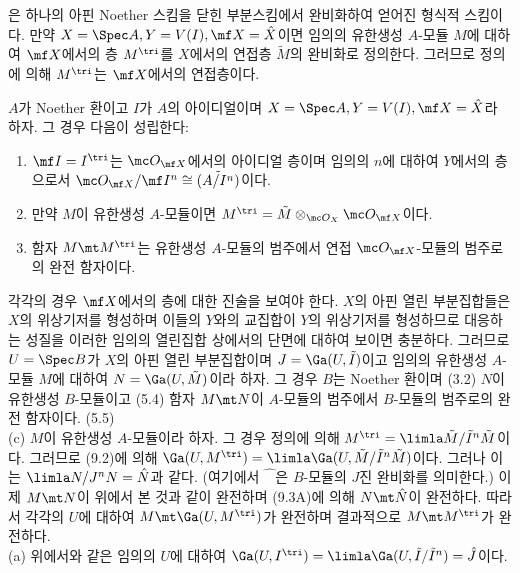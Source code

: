	
	\begin{definition}
	은
	하나의 아핀 Noether 스킴을 닫힌 부분스킴에서 완비화하여 얻어진 형식적 스킴이다.
	만약 $X=\Spec A,Y=V(I),\mf X=\hat X$이면 임의의 유한생성 $A$-모듈 $M$에 대하여 $\mf X$에서의 층 $M^\tri$를
	$X$에서의 연접층 $\tilde M$의 완비화로 정의한다. 그러므로 정의에 의해 $M^\tri$는 $\mf X$에서의 연접층이다.
	\end{definition}
	
	
	\begin{proposition}
	$A$가 Noether 환이고 $I$가 $A$의 아이디얼이며 $X=\Spec A,Y=V(I),\mf X=\hat X$라 하자. 그 경우 다음이 성립한다:
	\begin{enumerate}[label=(\alph*)]
	\item $\mf I=I^\tri$는 $\mc O_{\mf X}$에서의 아이디얼 층이며
	임의의 $n$에 대하여 $Y$에서의 층으로서 $\mc O_{\mf X}/\mf I^n\cong\tilde{(A/I^n)}$이다.
	\item 만약 $M$이 유한생성 $A$-모듈이면 $M^\tri=\tilde M\otimes_{\mc O_X}\mc O_{\mf X}$이다.
	\item 함자 $M\mt M^\tri$는 유한생성 $A$-모듈의 범주에서 연접 $\mc O_{\mf X}$-모듈의 범주로의 완전 함자이다.\\
	\end{enumerate}
	\pf 각각의 경우 $\mf X$에서의 층에 대한 진술을 보여야 한다.
	$X$의 아핀 열린 부분집합들은 $X$의 위상기저를 형성하며 이들의 $Y$와의 교집합이 $Y$의 위상기저를 형성하므로
	대응하는 성질을 이러한 임의의 열린집합 상에서의 단면에 대하여 보이면 충분하다.
	그러므로 $U=\Spec B$가 $X$의 아핀 열린 부분집합이며 $J=\Ga(U,\tilde I)$이고
	임의의 유한생성 $A$-모듈 $M$에 대하여 $N=\Ga(U,\tilde M)$이라 하자.
	그 경우 $B$는 Noether 환이며 (3.2) $N$이 유한생성 $B$-모듈이고 (5.4)
	함자 $M\mt N$이 $A$-모듈의 범주에서 $B$-모듈의 범주로의 완전 함자이다. (5.5)\\
	(c) $M$이 유한생성 $A$-모듈이라 하자. 그 경우 정의에 의해 $M^\tri=\limla\tilde M/\tilde I^n\tilde M$이다.
	그러므로 (9.2)에 의해 $\Ga(U,M^\tri)=\limla\Ga(U,\tilde M/\tilde I^n\tilde M)$이다.
	그러나 이는 $\limla N/J^nN=\hat N$과 같다. (여기에서 $\hat{\phantom{N}}$은 $B$-모듈의 $J$진 완비화를 의미한다.)
	이제 $M\mt N$이 위에서 본 것과 같이 완전하며 (9.3A)에 의해 $N\mt\hat N$이 완전하다.
	따라서 각각의 $U$에 대하여 $M\mt\Ga(U,M^\tri)$가 완전하며 결과적으로 $M\mt M^\tri$가 완전하다.\\
	(a) 위에서와 같은 임의의 $U$에 대하여 $\Ga(U,I^\tri)=\limla\Ga(U,\tilde I/\tilde I^n)=\hat J$이다.

\end{proposition}
